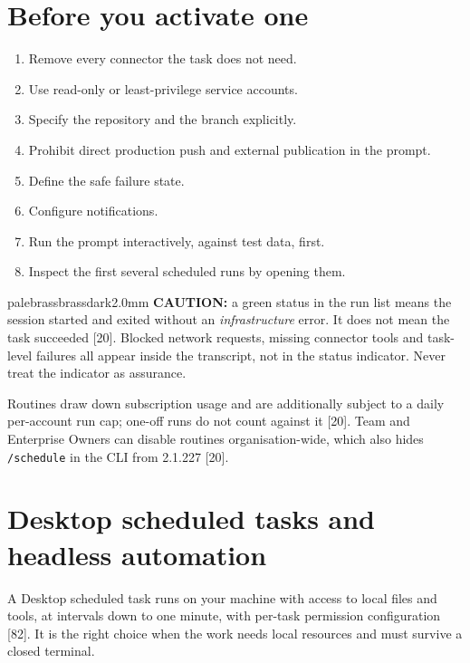 \documentclass[11pt,a4paper,twoside,openany]{book}
\begin{document}
\FloatBarrier
\setcounter{section}{3}
\section{Before you activate one}

\begin{enumerate}
\item Remove every connector the task does not need.
\item Use read-only or least-privilege service accounts.
\item Specify the repository and the branch explicitly.
\item Prohibit direct production push and external publication in the prompt.
\item Define the safe failure state.
\item Configure notifications.
\item Run the prompt interactively, against test data, first.
\item Inspect the first several scheduled runs by opening them.
\end{enumerate}

\begin{calloutbox}{palebrass}{brassdark}{2.0mm}
\textbf{CAUTION:} a green status in the run list means the session started and exited without an \emph{infrastructure} error. It does not mean the task succeeded [20]. Blocked network requests, missing connector tools and task-level failures all appear inside the transcript, not in the status indicator. Never treat the indicator as assurance.
\end{calloutbox}

Routines draw down subscription usage and are additionally subject to a daily per-account run cap; one-off runs do not count against it [20]. Team and Enterprise Owners can disable routines organisation-wide, which also hides \texttt{/\allowbreak{}schedule} in the CLI from 2.1.227 [20].


\FloatBarrier
\setcounter{section}{4}
\section{Desktop scheduled tasks and headless automation}

A Desktop scheduled task runs on your machine with access to local files and tools, at intervals down to one minute, with per-task permission configuration [82]. It is the right choice when the work needs local resources and must survive a closed terminal.
\end{document}
